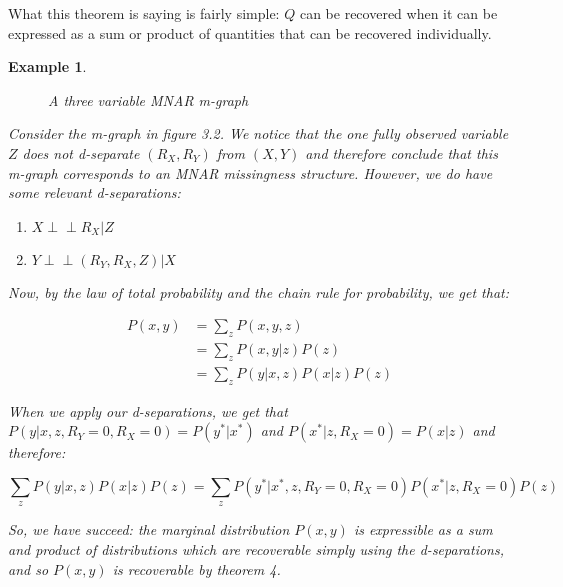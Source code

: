 \documentclass[12pt,twoside]{reedthesis}
\newtheorem{example}{Example}
\theoremstyle{definition}
\newcommand{\dsep}{\perp \!\!\!\perp}
\begin{document}
What this theorem is saying is fairly simple:  $Q$ can be recovered when it can be expressed as a sum or product of quantities that can be recovered individually.

\begin{example}
\begin{figure}
\centering
{}
\caption{A three variable MNAR m-graph} \label{fig:MNAREX}
\end{figure}

Consider the m-graph in figure 3.2. We notice that the one fully observed variable $Z$ does not d-separate $(R_X, R_Y)$ from $(X,Y)$ and therefore conclude that this m-graph corresponds to an MNAR missingness structure. However, we do have some relevant d-separations:

\begin{enumerate}
\item $X \dsep R_X | Z$
\item $Y \dsep (R_Y, R_X, Z) | X$
\end{enumerate}

Now, by the law of total probability and the chain rule for probability, we get that:

\begin{align*}
P(x,y) &= \sum_z P(x,y, z) \\
&= \sum_z P(x,y | z) P(z) \\
&= \sum_z P(y | x,z) P(x | z) P(z)
\end{align*}

When we apply our d-separations, we get that $P(y | x, z, R_Y = 0, R_X = 0) = P(y^*| x^*)$ and $P(x^*|z, R_X = 0) = P(x | z)$ and therefore:

$$\sum_z P(y | x,z) P(x | z) P(z) = \sum_z P(y^* | x^*,z, R_Y = 0, R_X = 0) P(x^* | z, R_X = 0) P(z)$$

So, we have succeed: the marginal distribution $P(x,y)$ is expressible as a sum and product of distributions which are recoverable simply using the d-separations, and so $P(x,y)$ is recoverable by theorem 4.
\end{example}
\end{document}
